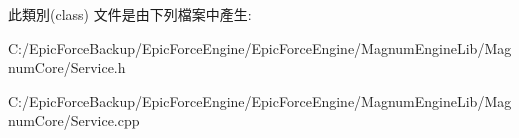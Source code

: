 此類別(class) 文件是由下列檔案中產生\+:\begin{DoxyCompactItemize}
\item 
C\+:/\+Epic\+Force\+Backup/\+Epic\+Force\+Engine/\+Epic\+Force\+Engine/\+Magnum\+Engine\+Lib/\+Magnum\+Core/Service.\+h\item 
C\+:/\+Epic\+Force\+Backup/\+Epic\+Force\+Engine/\+Epic\+Force\+Engine/\+Magnum\+Engine\+Lib/\+Magnum\+Core/Service.\+cpp\end{DoxyCompactItemize}
